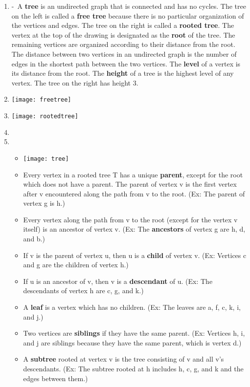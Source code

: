\documentclass[12pt,a4paper]{article}
\begin{document}
\begin{enumerate}
  \item {} -\ A \textbf{tree} is an undirected graph that is connected and has no cycles.
  The tree on the left is called a \textbf{free tree} because there is no particular organization of the vertices and edges. The tree on the right is called a \textbf{rooted tree}. The vertex at the top of the drawing is designated as the \textbf{root} of the tree. The remaining vertices are organized according to their distance from the root. The distance between two vertices in an undirected graph is the number of edges in the shortest path between the two vertices. The \textbf{level} of a vertex is its distance from the root. The \textbf{height} of a tree is the highest level of any vertex. The tree on the right has height 3.
  \item[] \texttt{[image: freetree]}
  \item[] \texttt{[image: rootedtree]}
  \item[] 
  \item[] 
  \begin{itemize}
    \item[] \texttt{[image: tree]}
    \item Every vertex in a rooted tree T has a unique \textbf{parent}, except for the root which does not have a parent. The parent of vertex v is the first vertex after v encountered along the path from v to the root. (Ex: The parent of vertex g is h.) 
    \item Every vertex along the path from v to the root (except for the vertex v itself) is an ancestor of vertex v. (Ex: The \textbf{ancestors} of vertex g are h, d, and b.)
    \item If v is the parent of vertex u, then u is a \textbf{child} of vertex v. (Ex: Vertices c and g are the children of vertex h.)
    \item If u is an ancestor of v, then v is a \textbf{descendant} of u. (Ex: The descendants of vertex h are c, g, and k.)
    \item A \textbf{leaf} is a vertex which has no children. (Ex: The leaves are a, f, c, k, i, and j.)
    \item Two vertices are \textbf{siblings} if they have the same parent. (Ex: Vertices h, i, and j are siblings because they have the same parent, which is vertex d.)
    \item A \textbf{subtree} rooted at vertex v is the tree consisting of v and all v's descendants. (Ex: The subtree rooted at h includes h, c, g, and k and the edges between them.)

\end{itemize}
\end{enumerate}
\end{document}
